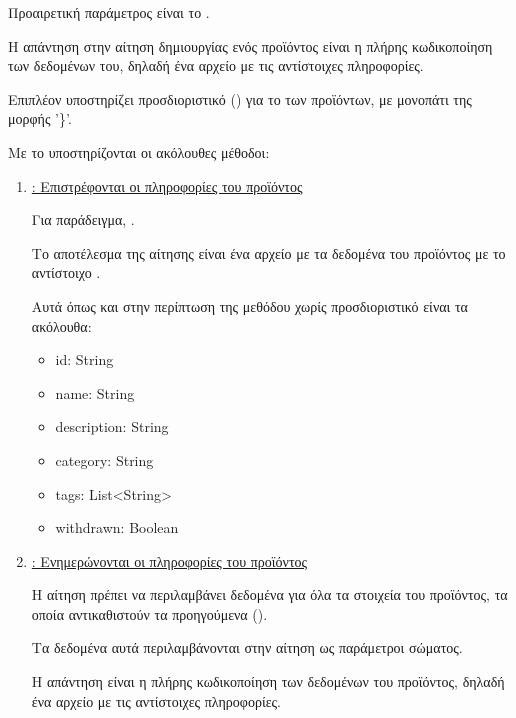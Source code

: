 \begin{itemize}
\begin{enumerate}
        Προαιρετική παράμετρος είναι το .
        
        Η απάντηση στην αίτηση δημιουργίας ενός προϊόντος 
        είναι η πλήρης κωδικοποίηση των δεδομένων του,
        δηλαδή ένα αρχείο  με τις αντίστοιχες πληροφορίες.
    \end{enumerate}

    Επιπλέον υποστηρίζει προσδιοριστικό () για το  των προϊόντων,
    με μονοπάτι της μορφής '\}'. 

    Με το  υποστηρίζονται οι ακόλουθες μέθοδοι:

    \begin{enumerate}
        \item \underline{\textbf{}: Επιστρέφονται οι πληροφορίες του προϊόντος}
        
        Για παράδειγμα,  \emph{}.

        Το αποτέλεσμα της αίτησης είναι ένα αρχείο 
        με τα δεδομένα του προϊόντος με το αντίστοιχο .

        Αυτά όπως και στην περίπτωση της μεθόδου  χωρίς προσδιοριστικό 
        είναι τα ακόλουθα:

        \begin{itemize}
            \item id: String
            \item name: String
            \item description: String
            \item category: String
            \item tags: List<String>
            \item withdrawn: Boolean
        \end{itemize}

        \item \underline{\textbf{}: Ενημερώνονται οι πληροφορίες του προϊόντος}
        
        Η αίτηση πρέπει να περιλαμβάνει δεδομένα για όλα τα στοιχεία του προϊόντος, 
        τα οποία αντικαθιστούν τα προηγούμενα ().

        Τα δεδομένα αυτά περιλαμβάνονται στην αίτηση ως παράμετροι σώματος.

        Η απάντηση είναι η πλήρης κωδικοποίηση των δεδομένων του προϊόντος,
        δηλαδή ένα αρχείο  με τις αντίστοιχες πληροφορίες.


\end{enumerate}
\end{itemize}
